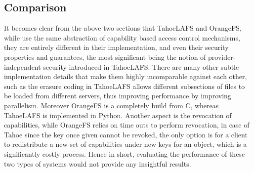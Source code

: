 \subsection{Comparison}
It becomes clear from the above two sections that TahoeLAFS and OrangeFS, while use the same abstraction of capability based access control mechanisms, they are entirely different in their implementation, and even their security properties and guarantees, the most significant being the notion of provider-independent security introduced in TahoeLAFS. There are many other subtle implementation details that make them highly incomparable against each other, such as the erasure coding in TahoeLAFS allows different subsections of files to be loaded from different servers, thus improving performance by improving parallelism. Moreover OrangeFS is a completely build from C, whereas TahoeLAFS is implemented in Python. Another aspect is the revocation of capabilities, while OrangeFS relies on time outs to perform revocation, in case of Tahoe since the key once given cannot be revoked, the only option is for a client to redistribute a new set of capabilities under new keys for an object, which is a significantly costly process. Hence in short, evaluating the performance of these two types of systems would not provide any insightful results.


